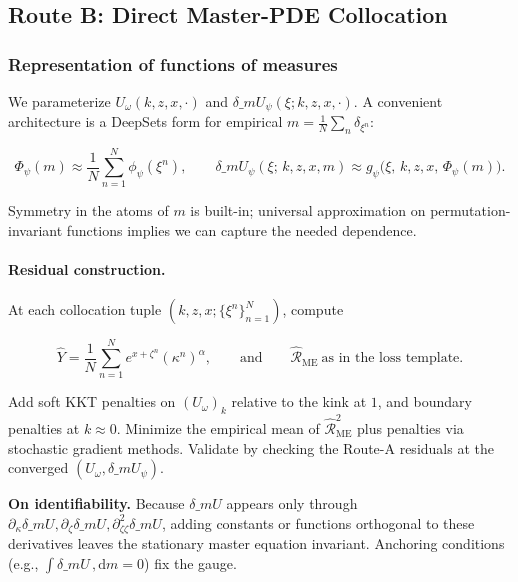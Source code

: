 \documentclass[11pt,letterpaper,oneside]{article}
\numberwithin{equation}{section}
\newcommand{\1}{\mathbf{1}}
\newcommand{\diff}{,\mathrm{d}}
\newcommand{\dmU}{\delta\_m U}
\begin{document}
\subsection{Route B: Direct Master-PDE Collocation}\label{sec:routeB}

\subsubsection*{Representation of functions of measures}
\begin{sloppypar}
We parameterize $U_\omega(k,z,x,\cdot)$ and $\dmU_\psi(\xi;k,z,x,\cdot)$. A convenient architecture is a DeepSets form for empirical $m=\tfrac1N\sum_{n}\delta_{\xi^n}$:

$$
\Phi_\psi(m)\approx \frac{1}{N}\sum_{n=1}^N \phi_\psi(\xi^n),\qquad
\dmU_\psi(\xi;\,k,z,x,m)\approx g_\psi\big(\xi,\,k,z,x,\, \Phi_\psi(m)\big).
$$

Symmetry in the atoms of $m$ is built-in; universal approximation on permutation-invariant functions implies we can capture the needed dependence.
\end{sloppypar}

\paragraph{Residual construction.}
At each collocation tuple $(k,z,x;\{\xi^n\}_{n=1}^N)$, compute

$$
\widehat Y=\frac{1}{N}\sum_{n=1}^N e^{x+\zeta^n}(\kappa^n)^\alpha,\qquad
\text{and}\qquad
\widehat{\mathcal{R}}_{\mathrm{ME}}\ \text{as in the loss template}.
$$

Add soft KKT penalties on $(U_\omega)_k$ relative to the kink at $1$, and boundary penalties at $k\approx 0$. Minimize the empirical mean of $\widehat{\mathcal{R}}_{\mathrm{ME}}^2$ plus penalties via stochastic gradient methods. Validate by checking the Route-A residuals at the converged $(U_\omega,\dmU_\psi)$.

\begin{tcolorbox}[mathstyle]
\textbf{On identifiability.} Because $\dmU$ appears only through $\partial_\kappa\dmU, \partial_\zeta\dmU, \partial_{\zeta\zeta}^2\dmU$, adding constants or functions orthogonal to these derivatives leaves the stationary master equation invariant. Anchoring conditions (e.g., $\int \dmU\,\diff m=0$) fix the gauge.
\end{tcolorbox}

\end{document}
